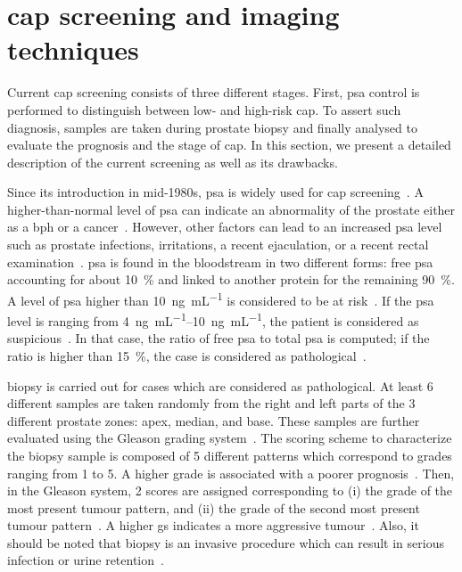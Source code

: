 \section{\acs*{cap} screening and imaging techniques}\label{sec:intro:screening}

Current \ac{cap} screening consists of three different stages.
First, \ac{psa} control is performed to distinguish between low- and high-risk \ac{cap}.
To assert such diagnosis, samples are taken during prostate biopsy and finally analysed to evaluate the prognosis and the stage of \ac{cap}.
In this section, we present a detailed description of the current screening as well as its drawbacks.

Since its introduction in mid-1980s, \ac{psa} is widely used for \ac{cap} screening~\cite{Etzioni2002}.
A higher-than-normal level of \ac{psa} can indicate an abnormality of the prostate either as a \ac{bph} or a cancer~\cite{Hoeks2011}.
However, other factors can lead to an increased \ac{psa} level such as prostate infections, irritations, a recent ejaculation, or a recent rectal examination~\cite{Parfait2010}.
\ac{psa} is found in the bloodstream in two different forms: free \ac{psa} accounting for about \SI{10}{\percent} and linked to another protein for the remaining \SI{90}{\percent}.
A level of \ac{psa} higher than \SI{10}{\nano\gram\per\milli\liter} is considered to be at risk~\cite{Parfait2010}.
If the \ac{psa} level is ranging from \SIrange{4}{10}{\nano\gram\per\milli\liter}, the patient is considered as suspicious~\cite{Barentsz2012}.
In that case, the ratio of free \ac{psa} to total \ac{psa} is computed; if the ratio is higher than \SI{15}{\percent}, the case is considered as pathological~\cite{Parfait2010}.

 biopsy is carried out for cases which are considered as pathological.
At least 6 different samples are taken randomly from the right and left parts of the 3 different prostate zones: apex, median, and base.
These samples are further evaluated using the Gleason grading system~\cite{Gleason1977}.
The scoring scheme to characterize the biopsy sample is composed of 5 different patterns which correspond to grades ranging from 1 to 5.
A higher grade is associated with a poorer prognosis~\cite{Epstein2005}.
Then, in the Gleason system, 2 scores are assigned corresponding to (i) the grade of the most present tumour pattern, and (ii) the grade of the second most present tumour pattern~\cite{Epstein2005}.
A higher \ac{gs} indicates a more aggressive tumour~\cite{Epstein2005}.
Also, it should be noted that biopsy is an invasive procedure which can result in serious infection or urine retention~\cite{Hara2005,Chou2011}.

